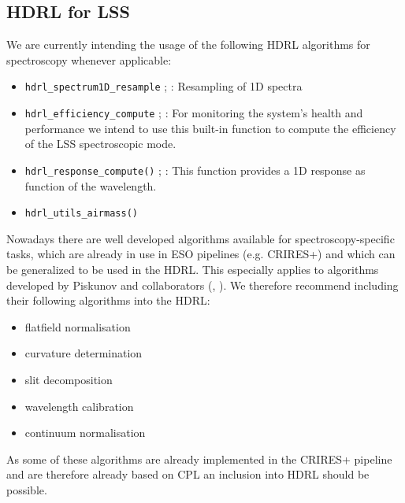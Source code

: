 

\subsection{HDRL for LSS}\label{ssec:hdrllss}
We are currently intending the usage of the following \ac{HDRL} algorithms for spectroscopy whenever applicable:

\begin{itemize}
    \item \texttt{hdrl\_spectrum1D\_resample}       ; : Resampling of 1D spectra
    \item \texttt{hdrl\_efficiency\_compute}        ; : For monitoring the system's health and performance we intend to use this built-in function to compute the efficiency of the \ac{LSS} spectroscopic mode.
    \item \texttt{hdrl\_response\_compute()}        ; : This function provides a 1D response as function of the wavelength.
    \item \texttt{hdrl\_utils\_airmass()}
\end{itemize}

Nowadays there are well developed algorithms available for spectroscopy-specific tasks, which are already in use in ESO pipelines (e.g. CRIRES+) and which can be generalized to be used in the \ac{HDRL}.
This especially applies to algorithms developed by Piskunov and collaborators (\cite{pis21}, \cite{pis02}).
We therefore recommend including their following algorithms into the \ac{HDRL}:

\begin{itemize}
    \item flatfield normalisation
    \item curvature determination
    \item slit decomposition
    \item wavelength calibration
    \item continuum normalisation
\end{itemize}

As some of these algorithms are already implemented in the \ac{CRIRES}+ pipeline
and are therefore already based on \ac{CPL} an inclusion into \ac{HDRL} should
be possible.


